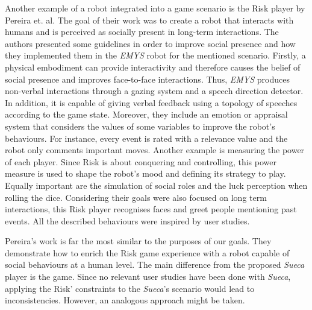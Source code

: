 Another example of a robot integrated into a game scenario is the Risk player by Pereira et. al.
The goal of their work was to create a robot that interacts with humans and is perceived as socially present in long-term interactions.
The authors presented some guidelines in order to improve social presence and how they implemented them in the \emph{EMYS} robot for the mentioned scenario.
Firstly, a physical embodiment can provide interactivity and therefore causes the belief of social presence and improves face-to-face interactions.
Thus, \emph{EMYS} produces non-verbal interactions through a gazing system and a speech direction detector.
In addition, it is capable of giving verbal feedback using a topology of speeches according to the game state.
Moreover, they include an emotion or appraisal system that considers the values of some variables to improve the robot's behaviours.
For instance, every event is rated with a relevance value and the robot only comments important moves.
Another example is measuring the power of each player.
Since Risk is about conquering and controlling, this power measure is used to shape the robot's mood and defining its strategy to play.
Equally important are the simulation of social roles and the luck perception when rolling the dice.
Considering their goals were also focused on long term interactions, this Risk player recognises faces and greet people mentioning past events.
All the described behaviours were inspired by user studies.

Pereira's work is far the most similar to the purposes of our goals.
They demonstrate how to enrich the Risk game experience with a robot capable of social behaviours at a human level.
The main difference from the proposed \emph{Sueca} player is the game.
Since no relevant user studies have been done with \emph{Sueca}, applying the Risk' constraints to the \emph{Sueca}'s scenario would lead to inconsistencies.
However, an analogous approach might be taken.

